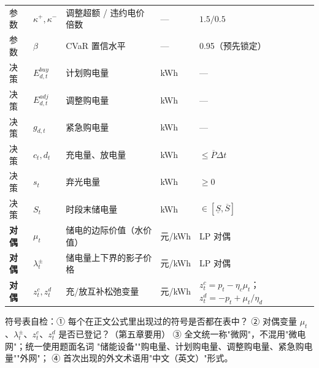 \begin{table}[htbp]
\begin{tabularx}{\linewidth}{C{1.2cm} C{2.6cm} L{5.2cm} C{1.6cm} Y}
    参数 & \(\kappa^{+},\kappa^{-}\) & 调整超额 / 违约电价倍数 & --- & \(1.5/0.5\) \\
    参数 & \(\beta\) & CVaR 置信水平 & --- & 0.95（预先锁定） \\
    \addlinespace
    决策 & \(E^{buy}_{d,t}\) & 计划购电量 & kWh & --- \\
    决策 & \(E^{adj}_{d,t}\) & 调整购电量 & kWh & --- \\
    决策 & \(g_{d,t}\) & 紧急购电量 & kWh & --- \\
    决策 & \(c_t,d_t\) & 充电量、放电量 & kWh & \(\le \overline P\Delta t\) \\
    决策 & \(s_t\) & 弃光电量 & kWh & \(\ge 0\) \\
    决策 & \(S_t\) & 时段末储电量 & kWh & \(\in[\underline S,\overline S]\) \\
    \addlinespace
    \textbf{对偶} & \(\mu_t\) & 储电的边际价值（水价值） & 元/kWh & LP 对偶 \\
    \textbf{对偶} & \(\lambda^{\pm}_t\) & 储电量上下界的影子价格 & 元/kWh & LP 对偶 \\
    \textbf{对偶} & \(z^{c}_t,z^{d}_t\) & 充/放互补松弛变量 & 元/kWh & \(z^c_t=p_t-\eta_c\mu_{t}\)；\(z^d_t=-p_t+\mu_{t}/\eta_d\) \\
    \bottomrule
  \end{tabularx}
\end{table}

\begin{guideblock}
符号表自检：① 每个在正文公式里出现过的符号是否都在表中？
② 对偶变量 \(\mu_t\)、\(\lambda^{\pm}_t\)、\(z^{c}_t\)、\(z^{d}_t\) 是否已登记？（第五章要用）
③ 全文统一称"微网"，不混用"微电网"；统一使用题面名词
"储能设备""购电量、计划购电量、调整购电量、紧急购电量""外网"；
④ 首次出现的外文术语用"中文（英文）"形式。
\end{guideblock}
